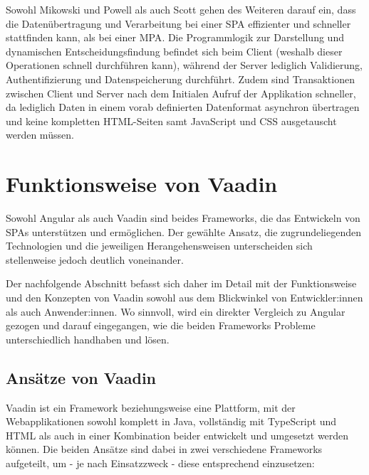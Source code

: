\documentclass[a4paper,12pt,twoside]{scrreprt}
\begin{document}
\newpage

Sowohl Mikowski und Powell als auch Scott gehen des Weiteren darauf ein, dass die Datenübertragung und Verarbeitung bei einer \ac{SPA} effizienter und schneller stattfinden kann, als bei einer \ac{MPA}. Die Programmlogik zur Darstellung und dynamischen Entscheidungsfindung befindet sich beim Client (weshalb dieser Operationen schnell durchführen kann), während der Server lediglich Validierung, Authentifizierung und Datenspeicherung durchführt. \parencite[][Seite 20]{mikowski_single_2013} Zudem sind Transaktionen zwischen Client und Server nach dem Initialen Aufruf der Applikation schneller, da lediglich Daten in einem vorab definierten Datenformat asynchron übertragen und keine kompletten HTML-Seiten samt JavaScript und \ac{CSS} ausgetauscht werden müssen. \parencite[][Seite 13]{scott_spa_2015}

\section{Funktionsweise von Vaadin}
\label{sec:funktionsweise-angular-vaadin}
Sowohl Angular als auch Vaadin sind beides Frameworks, die das Entwickeln von \acp{SPA} unterstützen und ermöglichen. Der gewählte Ansatz, die zugrundeliegenden Technologien und die jeweiligen Herangehensweisen unterscheiden sich stellenweise jedoch deutlich voneinander.

Der nachfolgende Abschnitt befasst sich daher im Detail mit der Funktionsweise und den Konzepten von Vaadin sowohl aus dem Blickwinkel von Entwickler:innen als auch Anwender:innen. Wo sinnvoll, wird ein direkter Vergleich zu Angular gezogen und darauf eingegangen, wie die beiden Frameworks Probleme unterschiedlich handhaben und lösen.

\subsection{Ansätze von Vaadin}
\label{sub-sec:vaadin-ansaetze}
Vaadin ist ein Framework beziehungsweise eine Plattform, mit der Webapplikationen sowohl komplett in Java, vollständig mit TypeScript und HTML als auch in einer Kombination beider entwickelt und umgesetzt werden können. Die beiden Ansätze sind dabei in zwei verschiedene Frameworks aufgeteilt, um - je nach Einsatzzweck - diese entsprechend einzusetzen:
\end{document}
